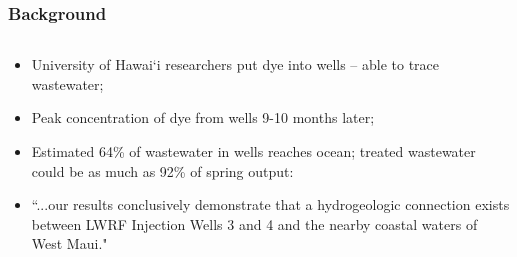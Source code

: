 \documentclass[aspectratio=169]{beamer}
\theoremstyle{principle}
\begin{document}
\begin{frame}
\frametitle{Background}
\begin{columns}

\begin{column}{0.5\textwidth}

\begin{itemize}

\item University of Hawai‘i researchers put dye into wells --  able to trace wastewater;
\bigskip
\item Peak concentration of dye from wells 9-10 months later;
\bigskip
\item Estimated 64\% of wastewater in wells reaches ocean; treated wastewater could be as much as 92\% of spring output:
\bigskip
\item ``...our  results  conclusively  demonstrate  that a  hydrogeologic  connection  exists between LWRF Injection Wells 3 and 4 and the nearby coastal  waters of West Maui." 
\end{itemize}
\end{column}

%


\end{columns}
\end{frame}
\end{document}
